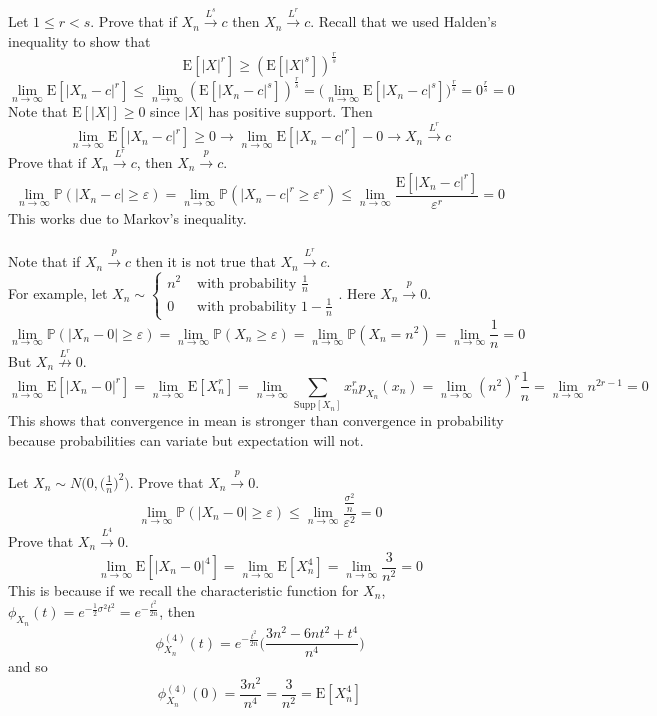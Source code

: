 \documentclass[12pt]{article}
\newcommand{\prob}[1]{\mathbb{P}(#1)}
\newcommand{\supp}[1]{\text{Supp}[ #1 ]}
\newcommand{\expected}[1]{\mathrm{E}[#1]}
\begin{document}
Let $1 \leq r < s$. Prove that if $X_n \stackrel{L^s}{\to} c$ then $X_n \stackrel{L^r}{\to} c$. Recall that we used Halden's inequality to show that $$ \expected{|X|^r} \geq ( \expected{|X|^s})^{\frac{r}{s}} $$ 
$$ \lim_{n \to \infty} \expected{|X_n - c|^r} \leq \lim_{n \to \infty} (\expected{|X_n - c|^s})^{\frac{r}{s}} = \Big( \lim_{n \to \infty} \expected{|X_n - c|^s} \Big)^{\frac{r}{s}} = 0^{\frac{r}{s}} = 0 $$ 
Note that $\expected{|X|} \geq 0$ since $|X|$ has positive support. Then 
$$ \lim_{n \to \infty} \expected{|X_n - c|^r} \geq 0 \to \lim_{n \to \infty} \expected{|X_n - c|^r} - 0 \to X_n \stackrel{L^r}{\to} c $$ 
Prove that if $X_n \stackrel{L^r}{\to} c$, then $X_n \stackrel{p}{\to} c$. 
$$ \lim_{n \to \infty} \prob{|X_n - c| \geq \varepsilon} = \lim_{n \to \infty} \prob{|X_n - c|^r \geq \varepsilon^r} \leq \lim_{n \to \infty} \frac{\expected{|X_n - c|^r}}{\varepsilon^r} = 0 $$ 
This works due to Markov's inequality. \\~\\
Note that if $X_n \stackrel{p}{\to} c$ then it is not true that $X_n \stackrel{L^r}{\to} c$. \\
For example, let $X_n \sim \begin{cases} n^2 &\text{ with probability } \frac{1}{n} \\ 0 &\text{ with probability } 1 - \frac{1}{n} \end{cases} $. Here $X_n \stackrel{p}{\to} 0$. 
$$ \lim_{n \to \infty} \prob{|X_n - 0| \geq \varepsilon} = \lim_{n \to \infty} \prob{X_n \geq \varepsilon} = \lim_{n \to \infty} \prob{X_n = n^2} = \lim_{n \to \infty} \frac{1}{n} = 0$$ 
But $X_n \stackrel{L^r}{\not\to} 0$.
$$ \lim_{n \to \infty} \expected{|X_n - 0|^r} = \lim_{n \to \infty} \expected{X_n^r} = \lim_{n \to \infty} \sum_{\supp{X_n}} x_n^r p_{X_n}(x_n) = \lim_{n \to \infty} (n^2)^r \frac{1}{n} = \lim_{n \to \infty} n^{2r - 1} = 0 $$ 
This shows that convergence in mean is stronger than convergence in probability because probabilities can variate but expectation will not. \\~\\
Let $X_n \sim N\Big( 0, \Big( \frac{1}{n} \Big)^2\Big)$. Prove that $X_n \stackrel{p}{\to} 0$. 
$$ \lim_{n \to \infty} \prob{|X_n - 0| \geq \varepsilon} \leq \lim_{n \to \infty} \frac{\frac{\sigma^2}{n}}{\varepsilon^2} = 0 $$ 
Prove that $X_n \stackrel{L^4}{\to} 0 $. 
$$ \lim_{n \to \infty} \expected{|X_n - 0|^4} = \lim_{n \to \infty} \expected{X_n^4} = \lim_{n \to \infty} \frac{3}{n^2} = 0$$ 
This is because if we recall the characteristic function for $X_n$, $\phi_{X_n}(t) = e^{-\frac{1}{2}\sigma^2t^2} = e^{-\frac{t^2}{2n}}$, then $$\phi_{X_n}^{(4)}(t) = e^{-\frac{t^2}{2n}}\Big( \frac{3n^2 - 6nt^2 + t^4}{n^4} \Big) $$ and so $$\phi_{X_n}^{(4)}(0) = \frac{3n^2}{n^4} = \frac{3}{n^2} = \expected{X_n^4} $$ 
\end{document}
